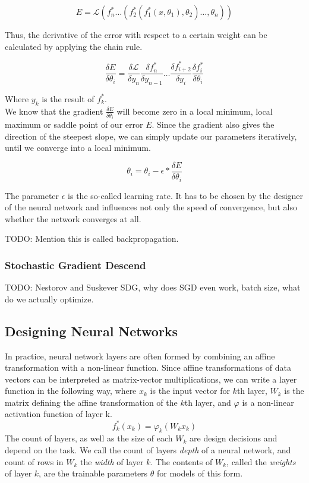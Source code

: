 \[
E = \mathcal{L}(f^*_n \dots (f^*_2(f^*_1(x, \theta_1), \theta_2) \dots, \theta_n))
\]

Thus, the derivative of the error with respect to a certain weight can be calculated by applying the chain rule.  

\[
\frac{\delta E}{\delta \theta_i} = 
	\frac{\delta \mathcal{L}}{\delta y_n}
	\frac{\delta f^*_n}{\delta y_{n - 1}}
	\dots
	\frac{\delta f^*_{i + 2}}{\delta y_i}
	\frac{\delta f^*_i}{\delta \theta_i}
\]

Where $y_k$ is the result of $f^*_k$. \\
We know that the gradient $\frac{\delta E}{\delta \theta_i}$ will become zero in a local minimum, local maximum or saddle point of our error $E$. Since the gradient also gives the direction of the steepest slope, we can simply update our parameters iteratively, until we converge into a local minimum. 

\[
	\theta_i = \theta_i - \epsilon * \frac{\delta E}{\delta \theta_i}
\]

The parameter $\epsilon$ is the so-called learning rate. It has to be chosen by the designer of the neural network and influences not only the speed of convergence, but also whether the network converges at all. 

TODO: Mention this is called backpropagation. 

\subsubsection{Stochastic Gradient Descend}

TODO: Nestorov and Suskever SDG, why does SGD even work, batch size, what do we actually optimize. 

\subsection{Designing Neural Networks}

In practice, neural network layers are often formed by combining an affine transformation with a non-linear function. Since affine transformations of data vectors can be interpreted as matrix-vector multiplications, we can write a layer function in the following way, where $x_k$ is the input vector for $k$th layer, $W_k$ is the matrix defining the affine transformation of the $k$th layer, and $\varphi$ is a non-linear activation function of layer k.
\[
f^*_k(x_k) = \varphi_k(W_k x_k)  
\]
The count of layers, as well as the size of each $W_k$ are design decisions and depend on the task. We call the count of layers \textit{depth} of a neural network, and count of rows in $W_k$ the \textit{width} of layer $k$. The contents of $W_k$, called the \textit{weights} of layer $k$, are the trainable parameters $\theta$ for models of this form.

